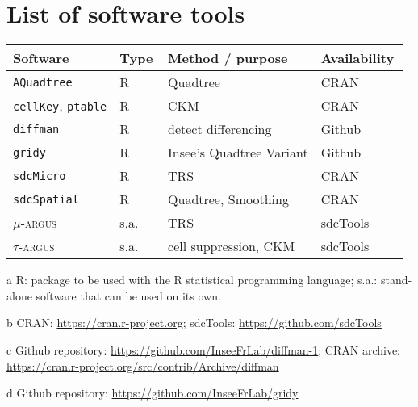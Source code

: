 \chapter*{List of software tools}

\begin{table}[H]
\begin{threeparttable}
    \centering
    \begin{tabular}{l l l l}
        Software & Type\,\tnote{a} & Method / purpose & Availability\,\tnote{b} \\
        \hline
        \texttt{AQuadtree} & R & Quadtree & CRAN \\
        \texttt{cellKey}, \texttt{ptable} & R & CKM & CRAN \\
        \texttt{diffman} & R & detect differencing & Github\,\tnote{c} \\
        \texttt{gridy} & R & Insee's Quadtree Variant & Github\,\tnote{d} \\
        \texttt{sdcMicro} & R & TRS & CRAN \\
        \texttt{sdcSpatial} & R & Quadtree, Smoothing & CRAN \\
        \hline
        $\mu$-\textsc{argus} & s.a. & TRS & sdcTools \\
        $\tau$-\textsc{argus} & s.a. & cell suppression, CKM  & sdcTools\\
        \hline
    \end{tabular}
    \label{tab:software}
\bigskip

{\footnotesize
\begin{tablenotes}
    \item[a] R: package to be used with the R statistical programming language; s.a.: stand-alone software that can be used on its own.
    \item[b] CRAN: \url{https://cran.r-project.org}; sdcTools: \url{https://github.com/sdcTools}
    \item[c] Github repository: \url{https://github.com/InseeFrLab/diffman-1}; CRAN archive: \url{https://cran.r-project.org/src/contrib/Archive/diffman}
    \item[d] Github repository: \url{https://github.com/InseeFrLab/gridy}
\end{tablenotes}}
\end{threeparttable}
\end{table}

